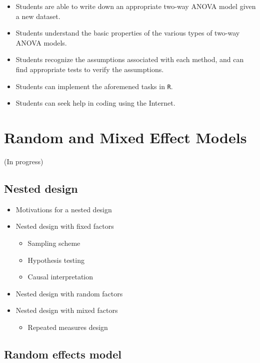 \documentclass[12pt,]{book}
\providecommand{\tightlist}{%
  \setlength{\itemsep}{0pt}\setlength{\parskip}{0pt}}
\begin{document}
\begin{itemize}
\tightlist
\item
  Students are able to write down an appropriate two-way ANOVA model
  given a new dataset.
\item
  Students understand the basic properties of the various types of
  two-way ANOVA models.
\item
  Students recognize the assumptions associated with each method, and
  can find appropriate tests to verify the assumptions.
\item
  Students can implement the aforemened tasks in \texttt{R}.
\item
  Students can seek help in coding using the Internet.
\end{itemize}

\chapter{Random and Mixed Effect Models}\label{ch:nested}

(In progress)

\section{Nested design}\label{nested-design}

\begin{itemize}
\tightlist
\item
  Motivations for a nested design
\item
  Nested design with fixed factors

  \begin{itemize}
  \tightlist
  \item
    Sampling scheme
  \item
    Hypothesis testing
  \item
    Causal interpretation
  \end{itemize}
\item
  Nested design with random factors
\item
  Nested design with mixed factors

  \begin{itemize}
  \tightlist
  \item
    Repeated measures design
  \end{itemize}
\end{itemize}

\section{Random effects model}\label{random-effects-model}
\end{document}
